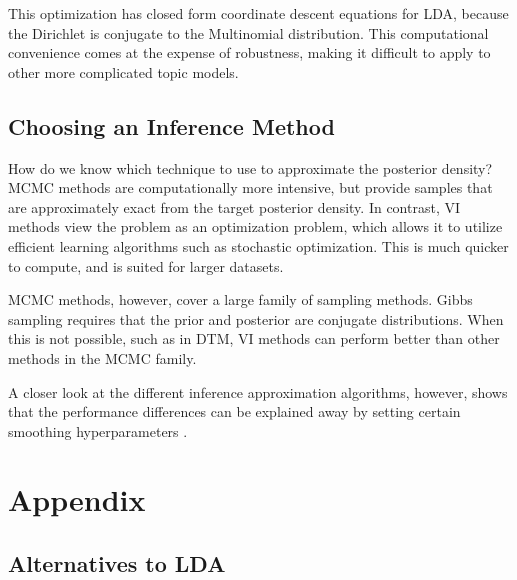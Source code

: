 \documentclass[letterpaper]{article}
\begin{document}
This optimization has closed form coordinate descent equations for
LDA, because the Dirichlet is conjugate to the Multinomial
distribution. This computational convenience comes at the expense of
robustness, making it difficult to apply to other more complicated
topic models.

\subsection{Choosing an Inference Method}
\label{sub:choosing-inference}
How do we know which technique to use to approximate the posterior
density? MCMC methods are computationally more intensive, but provide
samples that are approximately exact from the target posterior
density. In contrast, VI methods view the problem as an optimization
problem, which allows it to utilize efficient learning algorithms such
as stochastic optimization. This is much quicker to compute, and is
suited for larger datasets.

MCMC methods, however, cover a large family of sampling methods.
Gibbs sampling requires that the prior and posterior are conjugate
distributions. When this is not possible, such as in DTM, VI methods
can perform better than other methods in the MCMC family.

A closer look at the different inference approximation algorithms,
however, shows that the performance differences can be explained away
by setting certain smoothing hyperparameters
\cite{asuncion-2012-smoot-infer}.

\section{Appendix}

\subsection{Alternatives to LDA}


\end{document}
